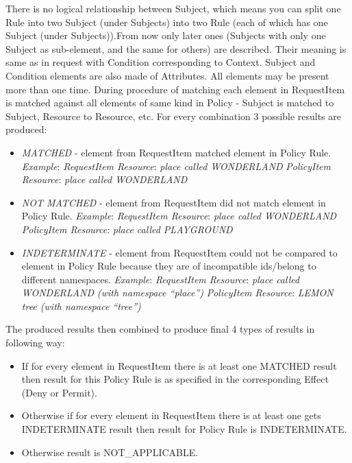 \documentclass{article}                            %
\begin{document}
There is no logical relationship between Subject, which means you can split one Rule into two Subject (under Subjects) into two Rule (each of which has one Subject (under Subjects)).From now only later ones (Subjects with only one Subject as sub-element, and the same for others) are described. Their meaning is same as in request with Condition corresponding to Context. Subject and Condition elements are also made of Attributes. All elements may be present more than one time. During procedure of matching each element in RequestItem is matched against all elements of same kind in Policy - Subject is matched to Subject, Resource to Resource, etc. For every combination 3 possible results are produced:

    \begin{itemize}
        \item \emph{MATCHED} - element from RequestItem matched element in Policy Rule.
            \emph{Example}:
            \emph{RequestItem Resource}: \textit{place called WONDERLAND}
            \emph{PolicyItem Resource}: \textit{place called WONDERLAND}
        \item \emph{NOT MATCHED} - element from RequestItem did not match element in Policy Rule.
            \emph{Example}:
            \emph{RequestItem Resource}: \textit{place called WONDERLAND}
            \emph{PolicyItem Resource}: \textit{place called PLAYGROUND}
        \item \emph{INDETERMINATE} - element from RequestItem could not be compared to element in Policy  Rule because they are of incompatible ids/belong to different namespaces.
            \emph{Example}:
            \emph{RequestItem Resource}: \textit{place called WONDERLAND (with namespace ``place'')}
            \emph{PolicyItem Resource}: \textit{LEMON tree (with namespace ``tree'')}
    \end{itemize}

The produced results then combined to produce final 4 types of results in following way:

    \begin{itemize}
        \item If for every element in RequestItem there is at least one MATCHED result then result for this Policy Rule is as specified in the corresponding Effect (Deny or Permit).
        \item Otherwise if for every element in RequestItem there is at least one gets INDETERMINATE result then result for Policy Rule is INDETERMINATE.
        \item Otherwise result is NOT\_APPLICABLE.
    \end{itemize}
\end{document}
